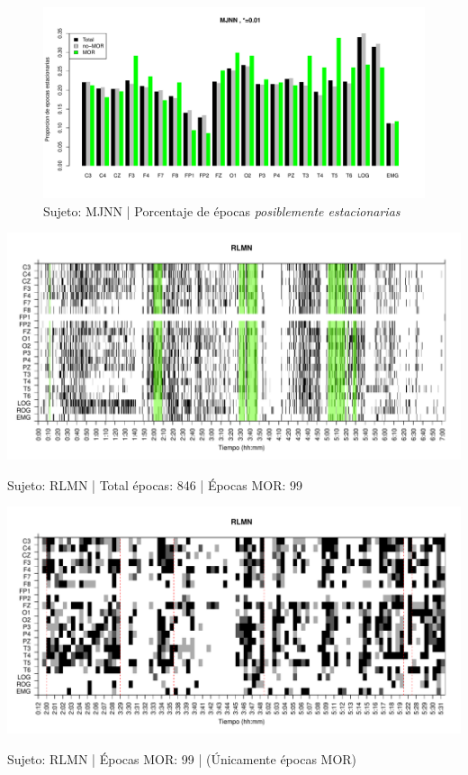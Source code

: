 \begin{figure}
\centering
\includegraphics[width=\linewidth]
{./material_bonito170220/porcentaje_bis/MJNNVIGILOS_127_1032_1_bar_porcentaje.pdf} 
\caption{Sujeto: MJNN | Porcentaje de \'epocas \textit{posiblemente estacionarias}}
\end{figure}


\begin{SidewaysFigure}
\centering
\includegraphics[width=\linewidth]{./material_bonito170220/RLMN10SUE_99_mor99_tot846_est_total.pdf} 
\caption{Sujeto: RLMN | Total \'epocas: 846 | \'Epocas MOR: 99}
\end{SidewaysFigure}
\begin{SidewaysFigure}
\centering
\includegraphics[width=\linewidth]
{./material_bonito170220/RLMN10SUE_99_mor99_tot99_est_mor.pdf} 
\caption{Sujeto: RLMN | \'Epocas MOR: 99 | (\'Unicamente \'epocas MOR)}
\end{SidewaysFigure}

